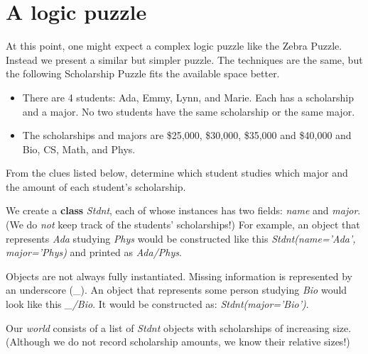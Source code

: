 \section{A logic puzzle}\label{sec:logic-puzzle}

At this point, one might expect a complex logic puzzle like the Zebra Puzzle\cite{ZebraPuzzle}. Instead we present a similar but simpler puzzle. The techniques are the same, but the following Scholarship Puzzle\cite{ScholarshipPuzzle} fits the available space better. 


\begin{itemize}
    \item There are 4 students: Ada, Emmy, Lynn, and Marie. Each has a scholarship and a major.  No two students have the same scholarship or the same major. 
    \item The scholarships and majors are \$25,000, \$30,000, \$35,000 and \$40,000 and Bio, CS, Math, and Phys. 
\end{itemize}

From the clues listed below, determine which student studies which major and the amount of each student's scholarship.

We create a \textbf{class} \textit{Stdnt}, each of whose instances has two fields: \textit{name} and \textit{major}. (We do \textit{not} keep track of the students' scholarships!) For example, an object that represents \textit{Ada} studying \textit{Phys} would be constructed like this \textit{Stdnt(name='Ada', major='Phys)} and printed as \textit{Ada/Phys}. 

Objects are not always fully instantiated. Missing information is represented by an underscore (\_). An object that represents some person studying \textit{Bio} would look like this \textit{\_/Bio}. It would be constructed as: \textit{Stdnt(major='Bio')}.

Our \textit{world} consists of a list of \textit{Stdnt} objects with scholarships of increasing size. (Although we do not record scholarship amounts, we know their relative sizes!)

